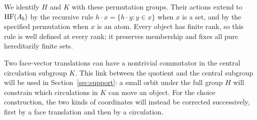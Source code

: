 We identify $H$ and $K$ with these permutation groups.  Their actions
extend to $\operatorname{HF}(A_b)$ by the recursive rule
$h\cdot x=\{h\cdot y:y\in x\}$ when $x$ is a set, and by the specified
permutation when $x$ is an atom.  Every object has finite rank, so this
rule is well defined at every rank; it preserves membership and fixes
all pure hereditarily finite sets.

Two face-vector translations can have a nontrivial commutator in the
central circulation subgroup $K$. This link between the quotient and the
central subgroup will be used in Section~\ref{sec:support}: a small orbit
under the full group $H$ will constrain which circulations in $K$ can
move an object. For the choice construction, the two kinds of coordinates
will instead be corrected successively, first by a face translation and
then by a circulation.
